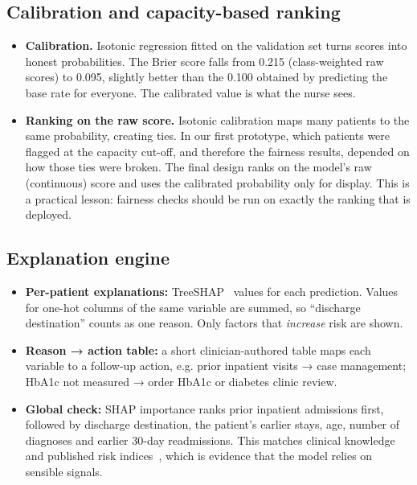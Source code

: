 \documentclass[10pt,a4paper]{article}
\begin{document}
\subsection{Calibration and capacity-based ranking}\label{sec:3.2}
\begin{itemize}
\item \textbf{Calibration.} Isotonic regression fitted on the validation set turns scores into honest probabilities. The Brier score falls from 0.215 (class-weighted raw scores) to 0.095, slightly better than the 0.100 obtained by predicting the base rate for everyone. The calibrated value is what the nurse sees.
\item \textbf{Ranking on the raw score.} Isotonic calibration maps many patients to the same probability, creating ties. In our first prototype, which patients were flagged at the capacity cut-off, and therefore the fairness results, depended on how those ties were broken. The final design ranks on the model's raw (continuous) score and uses the calibrated probability only for display. This is a practical lesson: fairness checks should be run on exactly the ranking that is deployed.
\end{itemize}

\subsection{Explanation engine}\label{sec:3.3}
\begin{itemize}
\item \textbf{Per-patient explanations:} TreeSHAP~\cite{lundberg2017} values for each prediction. Values for one-hot columns of the same variable are summed, so “discharge destination” counts as one reason. Only factors that \emph{increase} risk are shown.
\item \textbf{Reason → action table:} a short clinician-authored table maps each variable to a follow-up action, e.g. prior inpatient visits → case management; HbA1c not measured → order HbA1c or diabetes clinic review.
\item \textbf{Global check:} SHAP importance ranks prior inpatient admissions first, followed by discharge destination, the patient's earlier stays, age, number of diagnoses and earlier 30-day readmissions. This matches clinical knowledge and published risk indices~\cite{vanwalraven2010,donze2013}, which is evidence that the model relies on sensible signals.
\end{itemize}
\end{document}
